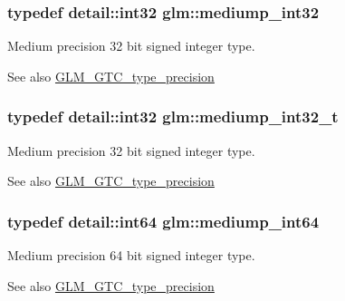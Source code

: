 \subsubsection[{mediump\+\_\+int32}]{\setlength{\rightskip}{0pt plus 5cm}typedef {\bf detail\+::int32} {\bf glm\+::mediump\+\_\+int32}}\label{group__gtc__type__precision_ga0660a752402702f420f13c686a7fff29}
Medium precision 32 bit signed integer type. \begin{DoxySeeAlso}{See also}
\hyperlink{group__gtc__type__precision}{G\+L\+M\+\_\+\+G\+T\+C\+\_\+type\+\_\+precision} 
\end{DoxySeeAlso}
\hypertarget{group__gtc__type__precision_gafd9b4bd9e4465aec63351b59100692c4}{}
\subsubsection[{mediump\+\_\+int32\+\_\+t}]{\setlength{\rightskip}{0pt plus 5cm}typedef {\bf detail\+::int32} {\bf glm\+::mediump\+\_\+int32\+\_\+t}}\label{group__gtc__type__precision_gafd9b4bd9e4465aec63351b59100692c4}
Medium precision 32 bit signed integer type. \begin{DoxySeeAlso}{See also}
\hyperlink{group__gtc__type__precision}{G\+L\+M\+\_\+\+G\+T\+C\+\_\+type\+\_\+precision} 
\end{DoxySeeAlso}
\hypertarget{group__gtc__type__precision_ga603c695fe5cd677d3f72a81343e19a74}{}
\subsubsection[{mediump\+\_\+int64}]{\setlength{\rightskip}{0pt plus 5cm}typedef detail\+::int64 {\bf glm\+::mediump\+\_\+int64}}\label{group__gtc__type__precision_ga603c695fe5cd677d3f72a81343e19a74}
Medium precision 64 bit signed integer type. \begin{DoxySeeAlso}{See also}
\hyperlink{group__gtc__type__precision}{G\+L\+M\+\_\+\+G\+T\+C\+\_\+type\+\_\+precision} 
\end{DoxySeeAlso}
\hypertarget{group__gtc__type__precision_ga555a2f85641550c232db473a9bb981f7}{}
